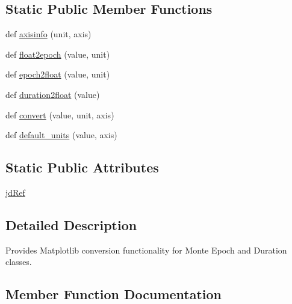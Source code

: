 \subsection*{Static Public Member Functions}
\begin{DoxyCompactItemize}
\item 
def \hyperlink{classmatplotlib_1_1testing_1_1jpl__units_1_1EpochConverter_1_1EpochConverter_a1913e75b4edb45c7e7f10617fec73ec1}{axisinfo} (unit, axis)
\item 
def \hyperlink{classmatplotlib_1_1testing_1_1jpl__units_1_1EpochConverter_1_1EpochConverter_a0bf9beda17b7240aa3fcf9307c577b7a}{float2epoch} (value, unit)
\item 
def \hyperlink{classmatplotlib_1_1testing_1_1jpl__units_1_1EpochConverter_1_1EpochConverter_ae1b0194c5a73fd24b6404a83b8cc3054}{epoch2float} (value, unit)
\item 
def \hyperlink{classmatplotlib_1_1testing_1_1jpl__units_1_1EpochConverter_1_1EpochConverter_a922b3ef7a1504323c74e5774c35728a6}{duration2float} (value)
\item 
def \hyperlink{classmatplotlib_1_1testing_1_1jpl__units_1_1EpochConverter_1_1EpochConverter_a9f95c4adcf41285006f1b96da450b401}{convert} (value, unit, axis)
\item 
def \hyperlink{classmatplotlib_1_1testing_1_1jpl__units_1_1EpochConverter_1_1EpochConverter_a54f25c9986874ed160f747fc10d5c145}{default\+\_\+units} (value, axis)
\end{DoxyCompactItemize}
\subsection*{Static Public Attributes}
\begin{DoxyCompactItemize}
\item 
\hyperlink{classmatplotlib_1_1testing_1_1jpl__units_1_1EpochConverter_1_1EpochConverter_a4532b7a537d30c2d42bd39f12ea07653}{jd\+Ref}
\end{DoxyCompactItemize}


\subsection{Detailed Description}
\begin{DoxyVerb}Provides Matplotlib conversion functionality for Monte Epoch and Duration
classes.
\end{DoxyVerb}
 

\subsection{Member Function Documentation}
\mbox{\label{classmatplotlib_1_1testing_1_1jpl__units_1_1EpochConverter_1_1EpochConverter_a1913e75b4edb45c7e7f10617fec73ec1}} 
